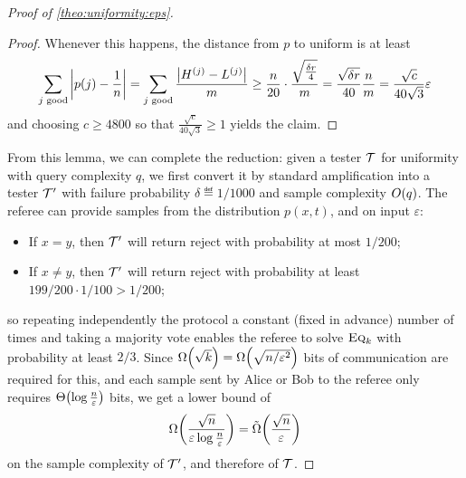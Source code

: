 \documentclass[11pt]{article}
\theoremstyle{remark}   	\newtheorem{remark}[theorem]{Remark}
\theoremstyle{definition}   	\newaliascnt{defn}{theorem}
\newenvironment{proofof}[1]{\begin{proof}[Proof of {#1}]}{\end{proof}}
\newcommand{\eps}{\ensuremath{\varepsilon}\xspace}
\newcommand{\reject}{\textsf{reject}\xspace}
\newcommand{\bigO}[1]{{O\mleft( #1 \mright)}}
\newcommand{\bigTheta}[1]{{\Theta\mleft( #1 \mright)}}
\newcommand{\bigOmega}[1]{{\Omega\mleft( #1 \mright)}}
\newcommand{\tildeOmega}[1]{\operatorname{\tilde{\Omega}}\mleft( #1 \mright)}
\newcommand{\abs}[1]{\left\lvert #1 \right\rvert}
\newcommand{\EQ}[1][n]{\textsc{Eq}_{#1}}
\begin{document}
\begin{proofof}{\autoref{theo:uniformity:eps}}
\begin{proof}
  Whenever this happens, the distance from $p$ to uniform is at least 
  \[
  \sum_{j\text{ \text{good}}} \abs{p(j) - \frac{1}{n}} = \sum_{j\text{ \text{good}}} \frac{\abs{H^{(j)} - L^{(j)}}}{m} \geq \frac{n}{20}\cdot \frac{\sqrt{\frac{\delta r}{4}}}{m} = \frac{\sqrt{\delta r}}{40} \frac{n}{m} = \frac{\sqrt{c}}{40\sqrt{3}}\eps
  \]
  and choosing $c \geq 4800$ so that $\frac{\sqrt{c}}{40\sqrt{3}} \geq 1$ yields the claim.
\end{proof}

From this lemma, we can complete the reduction: given a tester $\mathcal{T}$ for uniformity with query complexity $q$, we first convert it by standard amplification into a tester $\mathcal{T}^\prime$ with failure probability $\delta\eqdef 1/1000$ and sample complexity $\bigO{q}$. The referee can provide samples from the distribution $p(x,t)$, and on input $\eps$:
\begin{itemize}
  \item If $x=y$, then $\mathcal{T}^\prime$ will return \reject with probability at most $1/200$;
  \item If $x\neq y$, then $\mathcal{T}^\prime$ will return \reject with probability at least $199/200\cdot 1/100 > 1/200$;
\end{itemize} 
so repeating independently the protocol a constant (fixed in advance) number of times and taking a majority vote enables the referee to solve $\EQ[k]$ with probability at least $2/3$. Since $\bigOmega{\sqrt{k}} = \bigOmega{\sqrt{n/\eps^2}}$ bits of communication are required for this, and each sample sent by Alice or Bob to the referee only requires $\bigTheta{\log \frac{n}{\eps}}$ bits, we get a lower bound of 
\[
    \bigOmega{\frac{\sqrt{n}}{\eps\log \frac{n}{\eps}}} = \tildeOmega{\frac{\sqrt{n}}{\eps}}
\]
on the sample complexity of $\mathcal{T}^\prime$, and therefore of $\mathcal{T}$.
\end{proofof}
 
\end{document}
